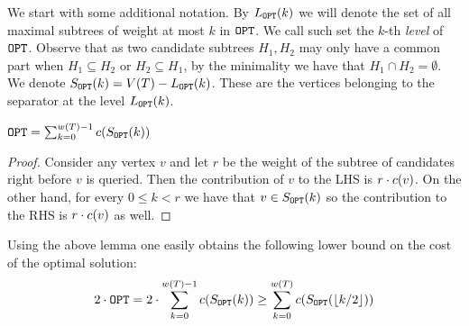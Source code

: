     We start with some additional notation. By $L_{\texttt{OPT}}\mathopen{}\left( k \right)$ we will denote the set of all maximal subtrees of weight at most $k$ in $\texttt{OPT}$. We call such set the $k$-th \textit{level} of $\texttt{OPT}$. Observe that as two candidate subtrees $H_1, H_2$ may only have a common part when $H_1\subseteq H_2$ or $H_2\subseteq H_1$, by the minimality we have that $H_1 \cap H_2 =\emptyset$. We denote $S_{\texttt{OPT}}\mathopen{}\left( k \right)=V\mathopen{}\left( T \right)-L_{\texttt{OPT}}\mathopen{}\left( k \right)$. These are the vertices belonging to the separator at the level $L_{\texttt{OPT}}\mathopen{}\left( k \right)$. 
    
            \begin{lemma}
                $\texttt{OPT}=\sum_{k=0}^{w\mathopen{}\left( T \right)-1}c\mathopen{}\left( S_{\texttt{OPT}}\mathopen{}\left( k \right) \right)$
            \begin{proof}
                Consider any vertex $v$ and let $r$ be the weight of the subtree of candidates right before $v$ is queried. Then the contribution of $v$ to the LHS is $r\cdot c\mathopen{}\left( v \right)$. On the other hand, for every $0\leq k<r$ we have that $v\in S_{\texttt{OPT}}\mathopen{}\left( k \right)$ so the contribution to the RHS is $r\cdot c\mathopen{}\left( v \right)$ as well.
            \end{proof}
            \end{lemma}
            Using the above lemma one easily obtains the following lower bound on the cost of the optimal solution:
            $$
            2\cdot\texttt{OPT}= 2\cdot\sum_{k=0}^{w\mathopen{}\left( T \right)-1}c\mathopen{}\left( S_{\texttt{OPT}}\mathopen{}\left( k \right) \right) \geq \sum_{k=0}^{w\mathopen{}\left( T \right)}c\mathopen{}\left( S_{\texttt{OPT}}\mathopen{}\left( \mathopen{}\left\lfloor k/2 \right\rfloor \right) \right)
            $$
             
